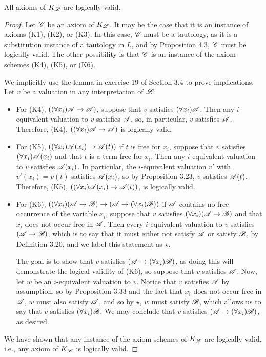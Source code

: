 \begin{proposition}
  All axioms of \(K_{\mathscr{L}}\) are logically valid.

  \begin{proof}
    Let \(\mathscr{C}\) be an axiom of \(K_{\mathscr{L}}\). It may be the case that it is an instance of axioms (K1), (K2), or (K3). In this case, \(\mathscr{C}\) must be a tautology, as it is a substitution instance of a tautology in \(L\), and by Proposition 4.3, \(\mathscr{C}\) must be logically valid. The other possibility is that \(\mathscr{C}\) is an instance of the axiom schemes (K4), (K5), or (K6).

    We implicitly use the lemma in exercise 19 of Section 3.4 to prove implications. Let \(v\) be a valuation in any interpretation of \(\mathscr{L}\).

    \begin{itemize}
      \item For (K4), \(((\forall x_i) \mathscr{A} \rightarrow \mathscr{A})\), suppose that \(v\) satisfies \((\forall x_i) \mathscr{A}\). Then any \(i\)-equivalent valuation to \(v\) satisfies \(\mathscr{A}\), so, in particular, \(v\) satisfies \(\mathscr{A}\). Therefore, (K4), \(((\forall x_i) \mathscr{A} \rightarrow \mathscr{A})\) is logically valid.

      \item For (K5), \(((\forall x_i) \mathscr{A}(x_i) \rightarrow \mathscr{A}(t))\) if \(t\) is free for \(x_i\), suppose that \(v\) satisfies \((\forall x_i) \mathscr{A}(x_i)\) and that \(t\) is a term free for \(x_i\). Then any \(i\)-equivalent valuation to \(v\) satisfies \(\mathscr{A}(x_i)\). In particular, the \(i\)-equivalent valuation \(v'\) with \(v'(x_i) = v(t)\) satisfies \(\mathscr{A}(x_i)\), so by Proposition 3.23, \(v\) satisfies \(\mathscr{A}(t)\). Therefore, (K5), \(((\forall x_i) \mathscr{A}(x_i) \rightarrow \mathscr{A}(t))\), is logically valid.

      \item For (K6), \(((\forall x_i)(\mathscr{A} \rightarrow \mathscr{B}) \rightarrow (\mathscr{A} \rightarrow (\forall x_i)\mathscr{B}))\) if \(\mathscr{A}\) contains no free occurrence of the variable \(x_i\), suppose that \(v\) satisfies \((\forall x_i)(\mathscr{A} \rightarrow \mathscr{B})\) and that \(x_i\) does not occur free in \(\mathscr{A}\). Then every \(i\)-equivalent valuation to \(v\) satisfies \((\mathscr{A} \rightarrow \mathscr{B})\), which is to say that it must either not satisfy \(\mathscr{A}\) or satisfy \(\mathscr{B}\), by Definition 3.20, and we label this statement as \(\star\).

        The goal is to show that \(v\) satisfies \((\mathscr{A} \rightarrow (\forall x_i) \mathscr{B})\), as doing this will demonstrate the logical validity of (K6), so suppose that \(v\) satisfies \(\mathscr{A}\). Now, let \(w\) be an \(i\)-equivalent valuation to \(v\). Notice that \(v\) satisfies \(\mathscr{A}\) by assumption, so by Proposition 3.33 and the fact that \(x_i\) does not occur free in \(\mathscr{A}\), \(w\) must also satisfy \(\mathscr{A}\), and so by \(\star\), \(w\) must satisfy \(\mathscr{B}\), which allows us to say that \(v\) satisfies \((\forall x_i) \mathscr{B}\). We may conclude that \(v\) satisfies \((\mathscr{A} \rightarrow (\forall x_i) \mathscr{B})\), as desired.
    \end{itemize}

    We have shown that any instance of the axiom schemes of \(K_{\mathscr{L}}\) are logically valid, i.e., any axiom of \(K_{\mathscr{L}}\) is logically valid.
  \end{proof}
\end{proposition}

